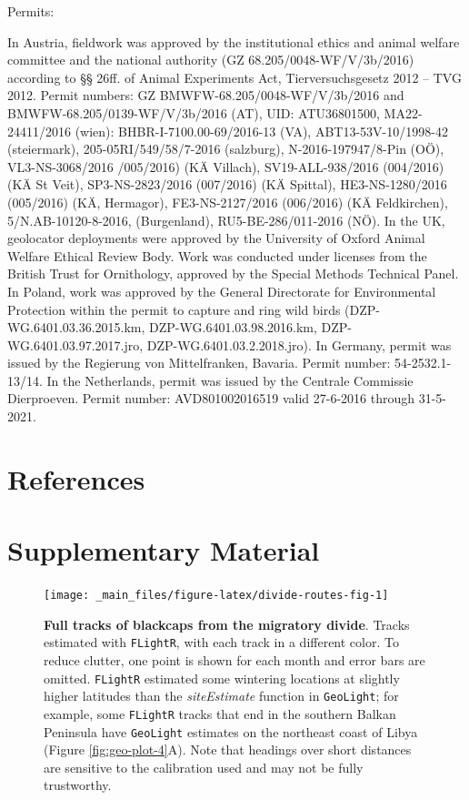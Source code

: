\documentclass[a4paper, twoside]{templates/ociamthesis}
\begin{document}
Permits:

In Austria, fieldwork was approved by the institutional ethics and animal welfare committee and the national authority (GZ 68.205/0048-WF/V/3b/2016) according to §§ 26ff. of Animal Experiments Act, Tierversuchsgesetz 2012 -- TVG 2012. Permit numbers: GZ BMWFW-68.205/0048-WF/V/3b/2016 and BMWFW-68.205/0139-WF/V/3b/2016 (AT), UID: ATU36801500, MA22-24411/2016 (wien): BHBR-I-7100.00-69/2016-13 (VA), ABT13-53V-10/1998-42 (steiermark), 205-05RI/549/58/7-2016 (salzburg), N-2016-197947/8-Pin (OÖ), VL3-NS-3068/2016 /005/2016) (KÄ Villach), SV19-ALL-938/2016 (004/2016) (KÄ St Veit), SP3-NS-2823/2016 (007/2016) (KÄ Spittal), HE3-NS-1280/2016 (005/2016) (KÄ, Hermagor), FE3-NS-2127/2016 (006/2016) (KÄ Feldkirchen), 5/N.AB-10120-8-2016, (Burgenland), RU5-BE-286/011-2016 (NÖ). In the UK, geolocator deployments were approved by the University of Oxford Animal Welfare Ethical Review Body. Work was conducted under licenses from the British Trust for Ornithology, approved by the Special Methods Technical Panel. In Poland, work was approved by the General Directorate for Environmental Protection within the permit to capture and ring wild birds (DZP-WG.6401.03.36.2015.km, DZP-WG.6401.03.98.2016.km, DZP-WG.6401.03.97.2017.jro, DZP-WG.6401.03.2.2018.jro). In Germany, permit was issued by the Regierung von Mittelfranken, Bavaria. Permit number: 54-2532.1-13/14. In the Netherlands, permit was issued by the Centrale Commissie Dierproeven. Permit number: AVD801002016519 valid 27-6-2016 through 31-5-2021.

\hypertarget{references}{%
\section{References}\label{references}}

\hypertarget{refs}{}

\hypertarget{supplementary-material}{%
\section{Supplementary Material}\label{supplementary-material}}



\begin{figure}
\texttt{[image: \_main\_files/figure-latex/divide-routes-fig-1]} \caption{\textbf{Full tracks of blackcaps from the migratory divide}. Tracks estimated with \texttt{FLightR}, with each track in a different color. To reduce clutter, one point is shown for each month and error bars are omitted. \texttt{FLightR} estimated some wintering locations at slightly higher latitudes than the \emph{siteEstimate} function in \texttt{GeoLight}; for example, some \texttt{FLightR} tracks that end in the southern Balkan Peninsula have \texttt{GeoLight} estimates on the northeast coast of Libya (Figure \ref{fig:geo-plot-4}A). Note that headings over short distances are sensitive to the calibration used and may not be fully trustworthy.}\label{fig:divide-routes-fig}
\end{figure}
\end{document}
